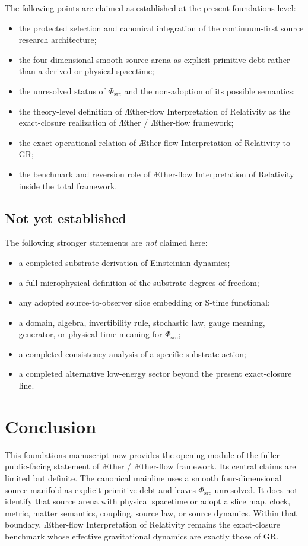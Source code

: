 \documentclass[11pt]{article}
\newcommand{\Aether}{\AE{}ther}
\newcommand{\Aflow}{\AE{}ther-flow}
\newcommand{\TheoryName}{\Aflow{} Interpretation of Relativity}
\newcommand{\TheoryProgram}{\Aether{} / \Aflow{} framework}
\newcommand{\PhiSrc}{\Phi_{\mathrm{src}}}
\begin{document}
The following points are claimed as established at the present foundations level:
\begin{itemize}
    \item the protected selection and canonical integration of the continuum-first source research architecture;
    \item the four-dimensional smooth source arena as explicit primitive debt rather than a derived or physical spacetime;
    \item the unresolved status of \(\PhiSrc\) and the non-adoption of its possible semantics;
    \item the theory-level definition of \TheoryName{} as the exact-closure realization of \TheoryProgram{};
    \item the exact operational relation of \TheoryName{} to GR;
    \item the benchmark and reversion role of \TheoryName{} inside the total framework.
\end{itemize}

\subsection{Not yet established}

The following stronger statements are \emph{not} claimed here:
\begin{itemize}
    \item a completed substrate derivation of Einsteinian dynamics;
    \item a full microphysical definition of the substrate degrees of freedom;
    \item any adopted source-to-observer slice embedding or S-time functional;
    \item a domain, algebra, invertibility rule, stochastic law, gauge meaning, generator, or physical-time meaning for \(\PhiSrc\);
    \item a completed consistency analysis of a specific substrate action;
    \item a completed alternative low-energy sector beyond the present exact-closure line.
\end{itemize}

\section{Conclusion}

This foundations manuscript now provides the opening module of the fuller
public-facing statement of \TheoryProgram{}. Its central claims are limited
but definite. The canonical mainline uses a smooth four-dimensional source
manifold as explicit primitive debt and leaves \(\PhiSrc\) unresolved. It does
not identify that source arena with physical spacetime or adopt a slice map,
clock, metric, matter semantics, coupling, source law, or source dynamics.
Within that boundary, \TheoryName{} remains the exact-closure benchmark whose
effective gravitational dynamics are exactly those of GR.
\end{document}
